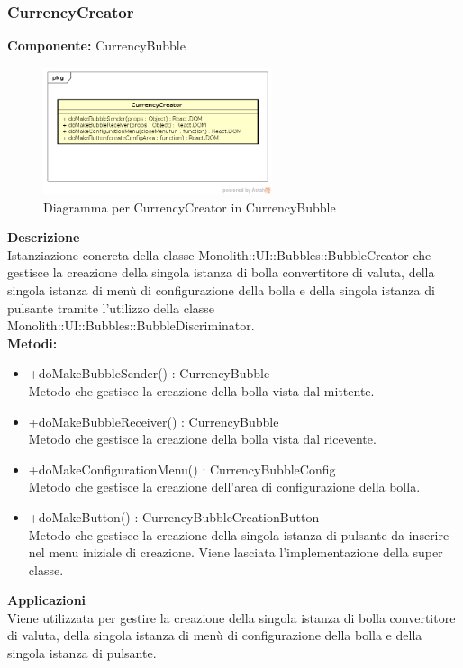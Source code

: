 \subsubsection{CurrencyCreator}
\textbf{Componente:}  CurrencyBubble\\
   \FloatBarrier
   \begin{figure}[ht]
   \centering
   \includegraphics[width=0.6\textwidth]{img/single-CurrencyCreator}
   \caption{{Diagramma per CurrencyCreator in CurrencyBubble}}
\end{figure}
\FloatBarrier
\textbf{Descrizione}\\
Istanziazione concreta della classe Monolith::UI::Bubbles::BubbleCreator che gestisce la creazione della singola istanza di bolla convertitore di valuta, della singola istanza di menù di configurazione della bolla e della singola istanza di pulsante tramite l'utilizzo della classe Monolith::UI::Bubbles::BubbleDiscriminator.
\\
\textbf{Metodi:} 
\begin{itemize}
\item +doMakeBubbleSender() : CurrencyBubble 
\\
Metodo che gestisce la creazione della bolla vista dal mittente.
\item +doMakeBubbleReceiver() : CurrencyBubble 
\\
Metodo che gestisce la creazione della bolla vista dal ricevente.
\item +doMakeConfigurationMenu() : CurrencyBubbleConfig 
\\
Metodo che gestisce la creazione dell'area di configurazione della bolla.
\item +doMakeButton() : CurrencyBubbleCreationButton 
\\
Metodo che gestisce la creazione della singola istanza di pulsante da inserire nel menu iniziale di creazione. Viene lasciata l'implementazione della super classe.
\end{itemize} 


\textbf{Applicazioni}\\
Viene utilizzata per gestire la creazione della singola istanza di bolla convertitore di valuta, della singola istanza di menù di configurazione della bolla e della singola istanza di pulsante. 


